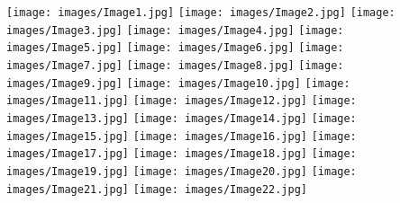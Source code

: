 \begin{figure*}[t]
    \centering
    \setlength{\lineskip}{0pt}
    \texttt{[image: images/Image1.jpg]}\hspace{-2.5pt}
    \texttt{[image: images/Image2.jpg]}\hspace{-2.5pt}
    \texttt{[image: images/Image3.jpg]}\hspace{-2.5pt}
    \texttt{[image: images/Image4.jpg]}\hspace{-2.5pt}
    \texttt{[image: images/Image5.jpg]}\hspace{-2.5pt}
    \texttt{[image: images/Image6.jpg]}\hspace{-2.5pt}
    \texttt{[image: images/Image7.jpg]}
    \texttt{[image: images/Image8.jpg]}\hspace{-2.5pt}
    \texttt{[image: images/Image9.jpg]}\hspace{-2.5pt}
    \texttt{[image: images/Image10.jpg]}\hspace{-2.5pt}
    \texttt{[image: images/Image11.jpg]}\hspace{-2.5pt}
    \texttt{[image: images/Image12.jpg]}\hspace{-2.5pt}
    \texttt{[image: images/Image13.jpg]}\hspace{-2.5pt}
    \texttt{[image: images/Image14.jpg]}
    \texttt{[image: images/Image15.jpg]}\hspace{-2.5pt}
    \texttt{[image: images/Image16.jpg]}\hspace{-2.5pt}
    \texttt{[image: images/Image17.jpg]}\hspace{-2.5pt}
    \texttt{[image: images/Image18.jpg]}\hspace{-2.5pt}
    \texttt{[image: images/Image19.jpg]}\hspace{-2.5pt}
    \texttt{[image: images/Image20.jpg]}\hspace{-2.5pt}
    \texttt{[image: images/Image21.jpg]}
    \texttt{[image: images/Image22.jpg]}\hspace{-2.5pt}

\end{figure*}
